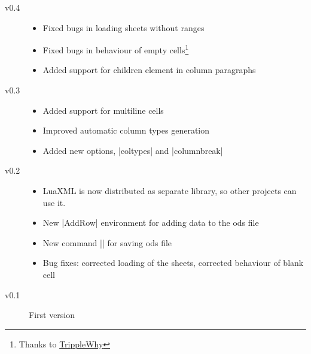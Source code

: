 \documentclass{ltxdoc}
\newcommand\ods{\textsf{ods}\xspace}
\begin{document}
\begin{description}
\item[v0.4]
\begin{itemize}
	\item Fixed bugs in loading sheets without ranges
	\item Fixed bugs in behaviour of empty cells\footnote{Thanks to \href{https://github.com/TripleWhy}{TrippleWhy}}
	\item Added support for children element in column paragraphs
\end{itemize}
\item[v0.3]
\begin{itemize}
  \item Added support for multiline cells
  \item Improved automatic column types generation
  \item Added new options, |coltypes| and |columnbreak|
\end{itemize}
\item[v0.2] 
\begin{itemize}
 \item LuaXML is now distributed as separate library, so other projects can use it.
 \item New |AddRow| environment for adding data to the \ods file
 \item New command |\savespreadsheet| for saving \ods file
 \item Bug fixes: corrected loading of the sheets, corrected behaviour of blank cell 
\end{itemize}
\item[v0.1] First version
\end{description}
\end{document}
